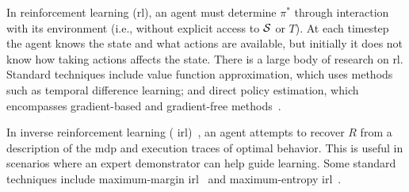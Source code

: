 In reinforcement learning ({\sc rl}), an agent must determine
$\pi^{*}$ through interaction with its environment (i.e., without
explicit access to $\mathcal{S}$ or $T$). At each timestep the agent knows
the state and what actions are available, but initially it does not know
how taking actions affects the state. There is a large body of
research on {\sc rl}. Standard techniques include value function
approximation, which uses methods such as temporal difference
learning; and direct policy estimation, which encompasses
gradient-based and gradient-free methods~\cite{suttonbarto}.

In inverse reinforcement learning ({\sc
  irl})~\cite{ng2000algorithms}, an agent attempts to recover $R$ from
a description of the {\sc mdp} and execution traces of optimal
behavior. This is useful in scenarios where an expert demonstrator can
help guide learning.  Some standard techniques include maximum-margin
{\sc irl}~\cite{abbeel2004apprenticeship} and maximum-entropy {\sc
  irl}~\cite{maxentirl}.
